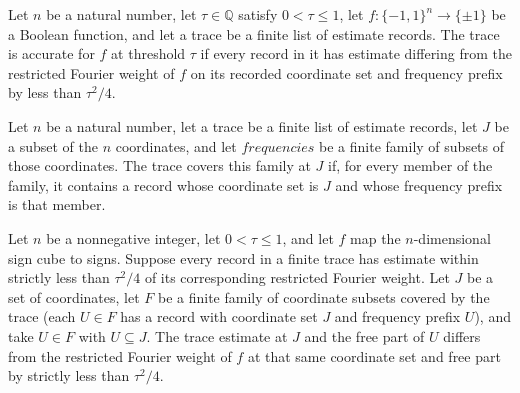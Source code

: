 \begin{definition}
\label{FABL.GoldreichLevinEstimateTrace.IsAccurate}
\leanok
{}
Let $n$ be a natural number, let $\tau\in\mathbb{Q}$ satisfy $0<\tau\leq 1$, let
$f:\{-1,1\}^n\to\{\pm1\}$ be a Boolean function, and let a trace be a finite list of
estimate records. The trace is accurate for $f$ at threshold $\tau$ if every record in
it has estimate differing from the restricted Fourier weight of $f$ on its recorded
coordinate set and frequency prefix by less than $\tau^2/4$.
\end{definition}

\begin{definition}
\label{FABL.GoldreichLevinEstimateTrace.Covers}
\leanok
{}
Let $n$ be a natural number, let a trace be a finite list of estimate records, let $J$
be a subset of the $n$ coordinates, and let $frequencies$ be a finite family of
subsets of those coordinates. The trace covers this family at $J$ if, for every member
of the family, it contains a record whose coordinate set is $J$ and whose frequency
prefix is that member.
\end{definition}

\begin{theorem}
\label{FABL.goldreichLevinTraceEstimate_accurate_of_mem}
\leanok
{}
Let $n$ be a nonnegative integer, let $0<\tau\le1$, and let $f$ map the
$n$-dimensional sign cube to signs. Suppose every record in a finite trace has estimate
within strictly less than $\tau^2/4$ of its corresponding restricted Fourier weight.
Let $J$ be a set of coordinates, let $F$ be a finite family of coordinate subsets
covered by the trace (each $U\in F$ has a record with coordinate set $J$ and frequency
prefix $U$), and take $U\in F$ with $U\subseteq J$. The trace estimate at $J$ and the
free part of $U$ differs from the restricted Fourier weight of $f$ at that same
coordinate set and free part by strictly less than $\tau^2/4$.
\end{theorem}

